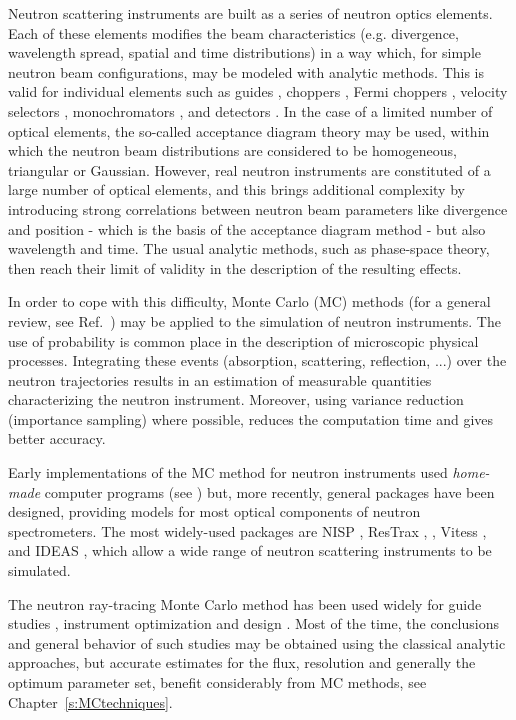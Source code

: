 Neutron scattering instruments are built as a series of neutron optics elements. Each of these elements modifies the beam characteristics (e.g. divergence, wavelength spread, spatial and time distributions) in a way which, for simple neutron beam configurations, may be modeled with analytic methods. This is valid for individual elements such as guides \cite{Leibnitz63,Mildner90}, choppers \cite{Lowde60,Copley03}, Fermi choppers \cite{Fermi47,Peters05}, velocity selectors \cite{Clark66}, monochromators \cite{Freund83,Sears97,Shirane02,Alianelli04}, and detectors \cite{Radeka74,Charpak89,Manzin04}. In the case of a limited number of optical elements, the so-called acceptance diagram theory \cite{Mildner90,Copley93,Cussen03} may be used, within which the neutron beam distributions are considered to be homogeneous, triangular or Gaussian.
However, real neutron instruments are constituted of a large number of optical elements, and this brings additional complexity by introducing strong correlations between neutron beam parameters like divergence and position - which is the basis of the acceptance diagram method - but also wavelength and time. The usual analytic methods, such as phase-space theory, then reach their limit of validity in the description of the resulting effects.

In order to cope with this difficulty, Monte Carlo (MC) methods (for a general review, see Ref.~\cite{James80}) may be applied to the simulation of neutron instruments.
The use of probability is common place in the description of microscopic physical processes. Integrating these events (absorption, scattering, reflection, ...) over the neutron trajectories
results in an estimation of measurable quantities characterizing the neutron instrument. Moreover, using variance reduction (importance sampling)
where possible, reduces the computation time and gives better accuracy.

Early implementations of the MC method for neutron instruments used \emph{home-made} computer programs  (see \cite{Copley86,Mildner77}) but, more recently, general packages have been designed, providing models for most optical components of neutron spectrometers.
The most widely-used packages are NISP \cite{NISP}, ResTrax \cite{Restrax}, \MCS \cite{mcs_ppf,nn_10_20,mcstas_webpage}, Vitess \cite{Vitess}, and IDEAS \cite{IDEAS}, which allow a wide range of neutron scattering instruments to be simulated.

The neutron ray-tracing Monte Carlo method has been used widely for
guide studies \cite{Copley93,Farhi02,Schanzer04}, instrument
optimization and design \cite{Zsigmond04,Lieutenant05}. Most of the
time, the conclusions and general behavior of such studies may be
obtained using the classical analytic approaches, but accurate
estimates for the flux, resolution and generally the optimum parameter
set, benefit considerably from MC methods, see Chapter~\ref{s:MCtechniques}.

